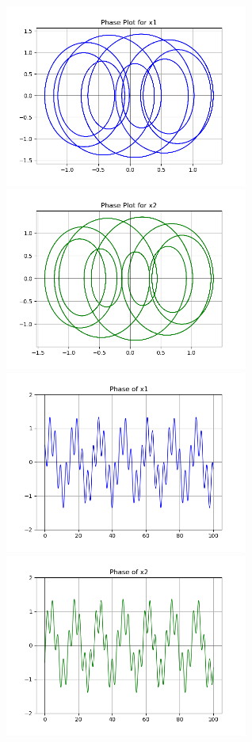 \documentclass[12pt]{article}
\begin{document}
\begin{center}
    \includegraphics[height=6cm]{G2_3a.png}\hspace*{\fill}
    \includegraphics[height=6cm]{G2_3b.png}\\
    \includegraphics[height=6cm]{G2_3c.png}\hspace*{\fill}
    \includegraphics[height=6cm]{G2_3d.png}\\

\end{center}
\end{document}
